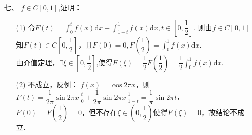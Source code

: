 \documentclass{ctexbook}
\begin{document}
\begin{enumerate}
    \item[七、]\(f\in C[0,1]\),证明：
    \begin{enumerate}[leftmargin=*,labelwidth=!,labelsep=0pt]
        \item[(1)] 令\(F(t)=\int_{0}^{t}f(x)\mathrm{d}x+\int_{1-t}^{1}f(x)\mathrm{d}x,t\in [0,\dfrac{1}{2}]\).
        则由\(f\in C[0,1]\)知\(F(t)\in C[0,\dfrac{1}{2}]\)，且\(F(0)=0,F(\dfrac{1}{2})=\int_{0}^{1}f(x)\mathrm{d}x\).\\
        由介值定理，\(\exists\xi\in[0,\dfrac{1}{2}]\),使得\(F(\xi)=\dfrac{1}{2}F(\dfrac{1}{2})=\dfrac{1}{2}\int_{0}^{1}f(x) \mathrm{d}x\).\\
        \item[(2)] 不成立，反例：
        \(f(x)=\cos 2\pi x\)，则\(F(t)=\dfrac{1}{2\pi}\sin 2\pi x\vert_{0}^{t}+\dfrac{1}{2\pi}\sin 2\pi x\vert_{1-t}^{1}=\dfrac{1}{\pi}\sin 2\pi t\)，\\
        \(F(0)=F(\dfrac{1}{2})=0\)，但不存在\(\xi\in (0,\dfrac{1}{2})\)使得\(F(\xi)=0\)，故结论不成立.
    \end{enumerate}

\end{enumerate}
\end{document}
